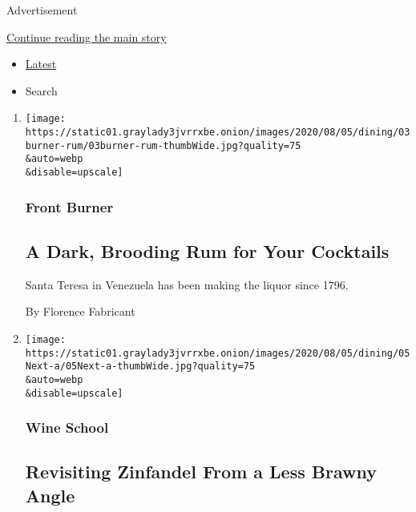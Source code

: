 Advertisement

\protect\hyperlink{after-mid1}{Continue reading the main story}

\begin{itemize}
\tightlist
\item
  \protect\hyperlink{stream-panel}{Latest}
\item
  Search
\end{itemize}

\begin{enumerate}
\def\labelenumi{\arabic{enumi}.}
\item
  \href{/2020/08/03/dining/drinks/santa-teresa-rum.html}{}

  \texttt{[image: https://static01.graylady3jvrrxbe.onion/images/2020/08/05/dining/03burner-rum/03burner-rum-thumbWide.jpg?quality=75\\\&auto=webp\\\&disable=upscale]}

  \hypertarget{front-burner}{%
  \subsubsection{Front Burner}\label{front-burner}}

  \hypertarget{a-dark-brooding-rum-for-your-cocktails}{%
  \subsection{A Dark, Brooding Rum for Your
  Cocktails}\label{a-dark-brooding-rum-for-your-cocktails}}

  Santa Teresa in Venezuela has been making the liquor since 1796.

  By Florence Fabricant
\item
  \href{/2020/07/30/dining/drinks/wine-school-assignment-zinfandel.html}{}

  \texttt{[image: https://static01.graylady3jvrrxbe.onion/images/2020/08/05/dining/05Next-a/05Next-a-thumbWide.jpg?quality=75\\\&auto=webp\\\&disable=upscale]}

  \hypertarget{wine-school-2}{%
  \subsubsection{Wine School}\label{wine-school-2}}

  \hypertarget{revisiting-zinfandel-from-a-less-brawny-angle}{%
  \subsection{Revisiting Zinfandel From a Less Brawny
  Angle}\label{revisiting-zinfandel-from-a-less-brawny-angle}}


\end{enumerate}
